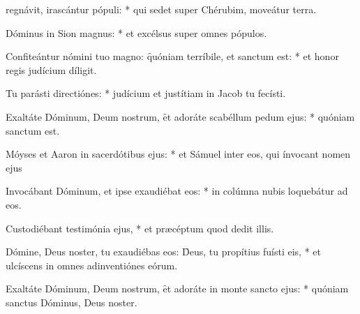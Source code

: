 \begin{psalmus}
    
     regnávit, irascántur pópuli: * qui sedet super Chérubim, moveátur terra.
    
    Dóminus in Sion magnus: * et excélsus super omnes pópulos.
    
    Confiteántur nómini tuo magno: \f quóniam terríbile, et sanctum est: * et honor regis judícium díligit.
    
    Tu parásti directiónes: * judícium et justítiam in Jacob tu fecísti.
    
    Exaltáte Dóminum, Deum nostrum, \f et adoráte scabéllum pedum ejus: * quóniam sanctum est.
    
    Móyses et Aaron in sacerdótibus ejus: * et Sámuel inter eos, qui ínvocant nomen ejus
    
    Invocábant Dóminum, et ipse exaudiébat eos: * in colúmna nubis loquebátur ad eos.
    
    Custodiébant testimónia ejus, * et præcéptum quod dedit illis.
    
    Dómine, Deus noster, tu exaudiébas eos: \f Deus, tu propítius fuísti eis, * et ulcíscens in omnes adinventiónes eórum.
    
    Exaltáte Dóminum, Deum nostrum, \f et adoráte in monte sancto ejus: * quóniam sanctus Dóminus, Deus noster.
    
    \end{psalmus}
